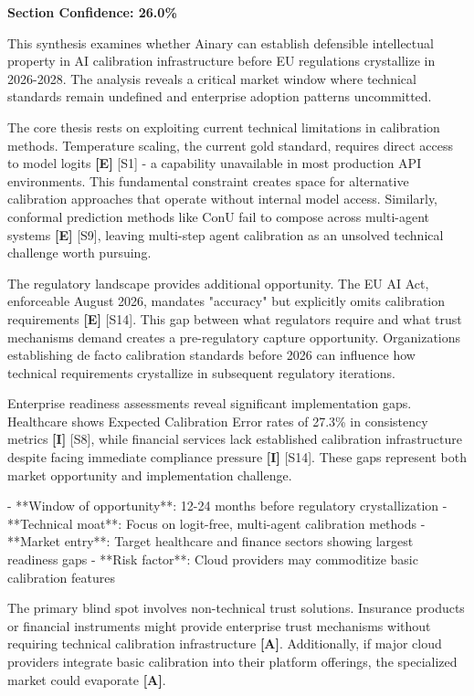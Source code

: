 \documentclass[a4paper,11pt]{article}
\newcommand{\elabel}{\textbf{\textcolor{ecolor}{[E]}}}
\newcommand{\ilabel}{\textbf{\textcolor{icolor}{[I]}}}
\newcommand{\alabel}{\textbf{\textcolor{acolor}{[A]}}}
\begin{document}
\textbf{Section Confidence: 26.0\%}\par

This synthesis examines whether Ainary can establish defensible intellectual property in AI calibration infrastructure before EU regulations crystallize in 2026-2028. The analysis reveals a critical market window where technical standards remain undefined and enterprise adoption patterns uncommitted.


The core thesis rests on exploiting current technical limitations in calibration methods. Temperature scaling, the current gold standard, requires direct access to model logits \elabel{} \textcolor{primary}{[S1]} - a capability unavailable in most production API environments. This fundamental constraint creates space for alternative calibration approaches that operate without internal model access. Similarly, conformal prediction methods like ConU fail to compose across multi-agent systems \elabel{} \textcolor{primary}{[S9]}, leaving multi-step agent calibration as an unsolved technical challenge worth pursuing.


The regulatory landscape provides additional opportunity. The EU AI Act, enforceable August 2026, mandates "accuracy" but explicitly omits calibration requirements \elabel{} \textcolor{primary}{[S14]}. This gap between what regulators require and what trust mechanisms demand creates a pre-regulatory capture opportunity. Organizations establishing de facto calibration standards before 2026 can influence how technical requirements crystallize in subsequent regulatory iterations.


Enterprise readiness assessments reveal significant implementation gaps. Healthcare shows Expected Calibration Error rates of 27.3\% in consistency metrics \ilabel{} \textcolor{primary}{[S8]}, while financial services lack established calibration infrastructure despite facing immediate compliance pressure \ilabel{} \textcolor{primary}{[S14]}. These gaps represent both market opportunity and implementation challenge.


\begin{decisionbox}
- **Window of opportunity**: 12-24 months before regulatory crystallization
- **Technical moat**: Focus on logit-free, multi-agent calibration methods
- **Market entry**: Target healthcare and finance sectors showing largest readiness gaps
- **Risk factor**: Cloud providers may commoditize basic calibration features
\end{decisionbox}


The primary blind spot involves non-technical trust solutions. Insurance products or financial instruments might provide enterprise trust mechanisms without requiring technical calibration infrastructure \alabel{}. Additionally, if major cloud providers integrate basic calibration into their platform offerings, the specialized market could evaporate \alabel{}.
\end{document}
